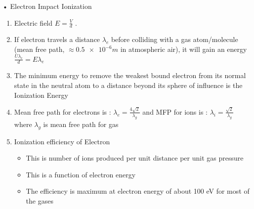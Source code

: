 \documentclass[11]{beamer}
\begin{document}
\begin{frame}{• Electron Impact Ionization}

\begin{exampleblock}

\begin{enumerate}
		\item Electric field $ E = \frac{V}{d}$ .
\item If electron travels a distance $\lambda_{e} $  before colliding with a gas atom/molecule (mean free path,  $\approx \num[round-precision=2,round-mode=figures,scientific-notation=true]{0.5e-6}m$ in atmospheric air), it will gain an energy   $ \frac{U \lambda_{e}}{d} = E \lambda_{e} $
\item The minimum energy to remove the weakest bound electron from its normal state in the neutral atom to a distance beyond its sphere of influence is the Ionization Energy
\item Mean free path for electrons is : $ \lambda_{e} = \frac{4\sqrt{2}}{\lambda_{g}} $  and MFP for ions is : $ \lambda_{i} = \frac{\sqrt{2}}{\lambda_{g}} $ 
where $ \lambda_{g} $  is mean free path for gas 

\item Ionization efficiency of Electron
       \begin{itemize}
        \item This is number of ions produced per unit distance per unit gas pressure

        \item This is a function of electron energy

       
        \item The efficiency is maximum at electron energy of about 100 eV for most of the gases

       
       \end{itemize}
       
		
\end{enumerate}

		
\end{exampleblock}

\end{frame}
\end{document}
